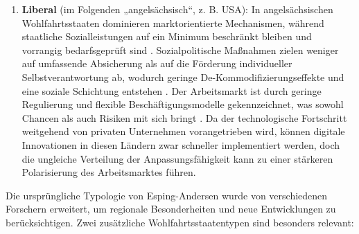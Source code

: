 \begin{enumerate}
    \item \textbf{Liberal} (im Folgenden „angelsächsisch“, z. B. USA): In angelsächsischen 
    Wohlfahrtsstaaten dominieren marktorientierte Mechanismen, während staatliche 
    Sozialleistungen auf ein Minimum beschränkt bleiben und vorrangig bedarfsgeprüft sind 
    \parencite[vgl.][S. 26–27]{espingandersen1990thethree}. Sozialpolitische Maßnahmen zielen 
    weniger auf umfassende Absicherung als auf die Förderung individueller Selbstverantwortung 
    ab, wodurch geringe De-Kommodifizierungseffekte und eine soziale Schichtung entstehen 
    \parencite[vgl.][S. 27]{espingandersen1990thethree}. Der Arbeitsmarkt ist durch geringe 
    Regulierung und flexible Beschäftigungsmodelle gekennzeichnet, was sowohl Chancen als auch 
    Risiken mit sich bringt \parencite[vgl.][S. 28–30]{hall2001varieties}. Da der technologische 
    Fortschritt weitgehend von privaten Unternehmen vorangetrieben wird, können digitale 
    Innovationen in diesen Ländern zwar schneller implementiert werden, doch die ungleiche 
    Verteilung der Anpassungsfähigkeit kann zu einer stärkeren Polarisierung des 
    Arbeitsmarktes führen.

\end{enumerate}

Die ursprüngliche Typologie von Esping-Andersen wurde von verschiedenen Forschern erweitert, um 
regionale Besonderheiten und neue Entwicklungen zu berücksichtigen. Zwei zusätzliche 
Wohlfahrtsstaatentypen sind besonders relevant:

